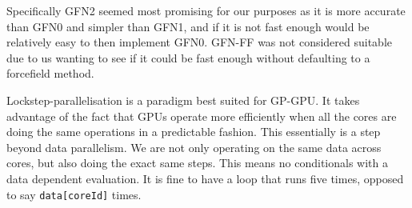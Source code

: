 Specifically GFN2 seemed most promising for our purposes as it is more accurate than GFN0 and simpler than GFN1, and if it is not fast enough would be relatively easy to then implement GFN0. GFN-FF was not considered suitable due to us wanting to see if it could be fast enough without defaulting to a forcefield method. 

Lockstep-parallelisation is a paradigm best suited for GP-GPU. It takes advantage of the fact that GPUs operate more efficiently when all the cores are doing the same operations in a predictable fashion. This essentially is a step beyond data parallelism. We are not only operating on the same data across cores, but also doing the exact same steps. This means no conditionals with a data dependent evaluation. It is fine to have a loop that runs five times, opposed to say \texttt{data[coreId]} times.


